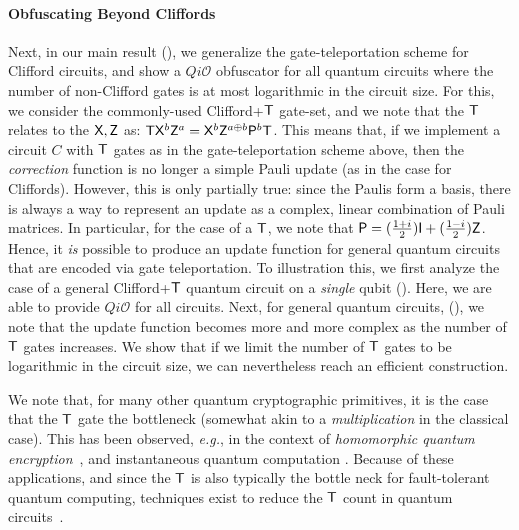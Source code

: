 \paragraph{Obfuscating Beyond Cliffords} Next, in our main result (), we generalize the gate-teleportation scheme for Clifford circuits, and show a $Qi\mathcal{O}$ obfuscator for all quantum circuits where the number of non-Clifford  gates is at most logarithmic in the circuit size. For this, we consider the commonly-used Clifford+${\sf T}$ gate-set, and we note that the ${\sf T}$ relates to the ${\sf X}, {\sf Z}$ as: ${\sf T} {\sf X}^b {\sf Z}^a={\sf X}^b {\sf Z}^{a\oplus b}{\sf P}^b {\sf T}$. This means that, if we implement a circuit $C$ with ${\sf T}$ gates as in the gate-teleportation scheme above, then the \emph{correction} function is no longer a simple Pauli update (as in the case for Cliffords). However, this is only partially true: since the Paulis form a basis, there is always a way to represent an update as a complex, linear combination of Pauli matrices. In particular, for the case of a ${\sf T}$, we note that ${\sf P}=(\frac{1+i}{2}) {\sf I} + (\frac{1-i}{2}){\sf Z}$. Hence, it \emph{is} possible to produce an update function for general quantum circuits that are encoded via gate teleportation. To illustration this, we first analyze the case of a general Clifford+${\sf T}$ quantum circuit on a \emph{single} qubit (). Here, we are able to provide $Qi\mathcal{O}$ for all circuits. Next, for general quantum circuits, (), we note that the update function becomes more and more complex as the number of ${\sf T}$ gates increases. We show that if we limit the number of ${\sf T}$ gates to be logarithmic in the circuit size, we can nevertheless reach an efficient construction.


We note that,  for many other quantum cryptographic primitives, it is the case that the ${\sf T}$ gate the bottleneck (somewhat akin to a \emph{multiplication} in the classical case). This has been observed, \emph{e.g.}, in the context of \emph{homomorphic quantum encryption}~\cite{BJ15}, and instantaneous quantum computation \cite{Spel16}.
Because of these applications, and since the ${\sf T}$ is also typically the bottle neck for fault-tolerant quantum computing, techniques exist to reduce the ${\sf T}$ count in quantum circuits~\cite{AMMR13,DMM16,AMM14}.



